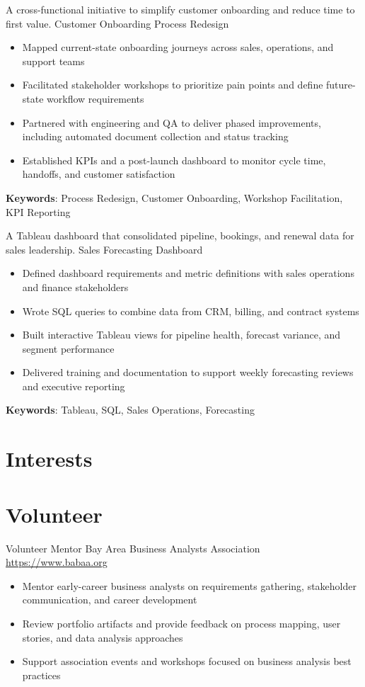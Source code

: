 \documentclass[a4paper, serif, 10pt]{moderncv}
\begin{document}
        {A cross-functional initiative to simplify customer onboarding and reduce time to first value.}
        {Customer Onboarding Process Redesign}
        {}
        {}
        {\begin{itemize}
\item Mapped current-state onboarding journeys across sales, operations, and support teams
\item Facilitated stakeholder workshops to prioritize pain points and define future-state workflow requirements
\item Partnered with engineering and QA to deliver phased improvements, including automated document collection and status tracking
\item Established KPIs and a post-launch dashboard to monitor cycle time, handoffs, and customer satisfaction
\end{itemize}
\textbf{Keywords}: Process Redesign, Customer Onboarding, Workshop Facilitation, KPI Reporting}

        {A Tableau dashboard that consolidated pipeline, bookings, and renewal data for sales leadership.}
        {Sales Forecasting Dashboard}
        {}
        {}
        {\begin{itemize}
\item Defined dashboard requirements and metric definitions with sales operations and finance stakeholders
\item Wrote SQL queries to combine data from CRM, billing, and contract systems
\item Built interactive Tableau views for pipeline health, forecast variance, and segment performance
\item Delivered training and documentation to support weekly forecasting reviews and executive reporting
\end{itemize}
\textbf{Keywords}: Tableau, SQL, Sales Operations, Forecasting}
\section{Interests}

\section{Volunteer}

        {Volunteer Mentor}
        {Bay Area Business Analysts Association}
        {\url{https://www.babaa.org}}
        {}
        {\begin{itemize}
\item Mentor early-career business analysts on requirements gathering, stakeholder communication, and career development
\item Review portfolio artifacts and provide feedback on process mapping, user stories, and data analysis approaches
\item Support association events and workshops focused on business analysis best practices
\end{itemize}}
    
\end{document}
